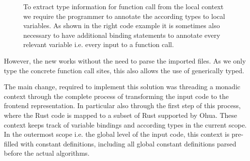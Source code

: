 \begin{figure}[H]
\centering
\tabskip=0pt
\caption{To extract type information for function call from the local context we require the  programmer to annotate the according types to local variables. As shown in the right code example it is sometimes also necessary to have additional binding statements to annotate every relevant variable i.e. every input to a function call.}
\label{fig:TypeExtractionExample}
\end{figure}

However, the new  works without the need to parse the imported files. As we only type the concrete function call sites, this also allows the use of generically typed.\\

The main change, required to implement this solution was threading a monadic context through the complete process of transforming the input code to the frontend representation. In particular also through the first step of this process, where the Rust code is mapped to a subset of Rust supported by Ohua. These context keeps track of variable bindings and according types in the current scope. In the outermost scope i.e. the global level of the input code, this context is pre-filled with constant definitions, including all global constant definitions parsed before the actual algorithms. 

